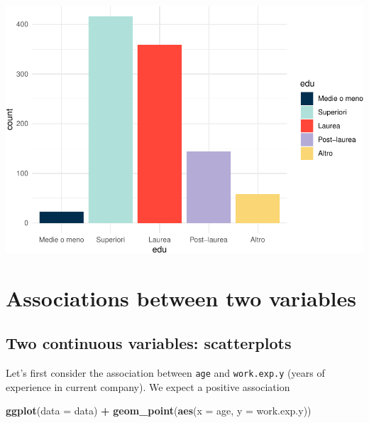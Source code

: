 \documentclass[
]{book}
\newenvironment{Shaded}{\begin{snugshade}}{\end{snugshade}}
\newcommand{\AttributeTok}[1]{\textcolor[rgb]{0.13,0.29,0.53}{#1}}
\newcommand{\FunctionTok}[1]{\textcolor[rgb]{0.13,0.29,0.53}{\textbf{#1}}}
\newcommand{\NormalTok}[1]{#1}
\newcommand{\SpecialCharTok}[1]{\textcolor[rgb]{0.81,0.36,0.00}{\textbf{#1}}}
\begin{document}
\includegraphics{R-for-social-research-and-business-analytics_files/figure-latex/unnamed-chunk-28-1.pdf}

\hypertarget{associations-between-two-variables}{%
\section{Associations between two variables}\label{associations-between-two-variables}}

\hypertarget{two-continuous-variables-scatterplots}{%
\subsection{Two continuous variables: scatterplots}\label{two-continuous-variables-scatterplots}}

Let's first consider the association between \texttt{age} and \texttt{work.exp.y} (years of experience in current company). We expect a positive association

\begin{Shaded}
\begin{Highlighting}[]
\FunctionTok{ggplot}\NormalTok{(}\AttributeTok{data =}\NormalTok{ data) }\SpecialCharTok{+}
  \FunctionTok{geom\_point}\NormalTok{(}\FunctionTok{aes}\NormalTok{(}\AttributeTok{x =}\NormalTok{ age, }\AttributeTok{y =}\NormalTok{ work.exp.y))}
\end{Highlighting}
\end{Shaded}
\end{document}
